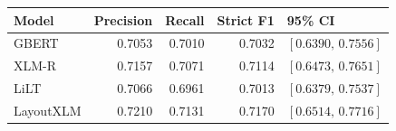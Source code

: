 \begin{tabular}{@{}lrrrl@{}}
\toprule
Model & Precision & Recall & Strict F1 & 95\% CI \\
\midrule
GBERT & 0.7053 & 0.7010 & 0.7032 & $[0.6390,\,0.7556]$ \\
XLM-R & 0.7157 & 0.7071 & 0.7114 & $[0.6473,\,0.7651]$ \\
LiLT & 0.7066 & 0.6961 & 0.7013 & $[0.6379,\,0.7537]$ \\
LayoutXLM & 0.7210 & 0.7131 & 0.7170 & $[0.6514,\,0.7716]$ \\
\bottomrule
\end{tabular}
